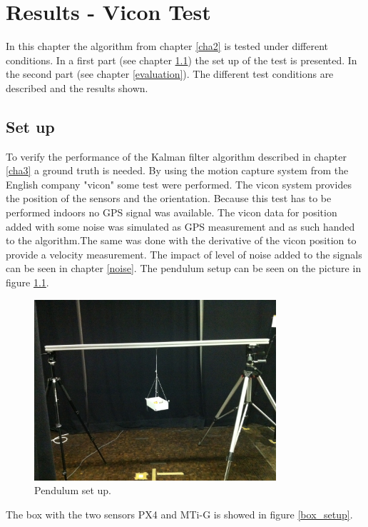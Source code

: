 \chapter{Results - Vicon Test}\label{cha4}
In this chapter the algorithm from chapter \ref{cha2} is tested under different conditions. In a first part (see chapter \ref{setup}) the set up of the test is presented. In the second part (see chapter \ref{evaluation}). The different test conditions are described and the results shown.
\section{Set up}\label{setup}
To verify the performance of the Kalman filter algorithm described in chapter \ref{cha3} a ground truth is needed.  By using the motion capture system from the English company "vicon" some test were performed. The vicon system provides the position of the sensors and the orientation. Because this test has to be performed indoors no GPS signal was available. The vicon data for position added with some noise was simulated as GPS measurement and as such handed to the algorithm.The same was done with the derivative of the vicon position to provide a velocity measurement. The impact of level of noise added to the signals can be seen in chapter \ref{noise}.
The pendulum setup can be seen on the picture in figure \ref{pend_setup}. 
\begin{figure}[h]
\centering
\includegraphics[width=0.8\textwidth]{vicon_bilder/IMG_0137.JPG}
\caption{Pendulum set up.}
\label{pend_setup}
\end{figure}
The box with the two sensors PX4 and MTi-G is showed in figure \ref{box_setup}.
